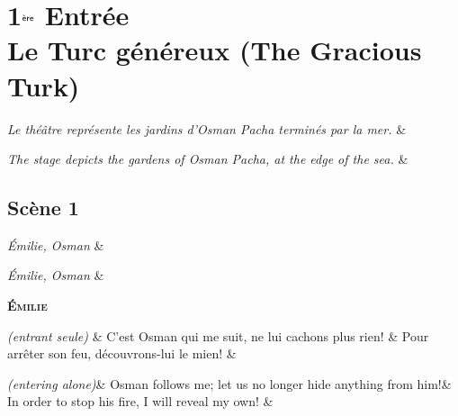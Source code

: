 \documentclass{article}
\newcommand{\accentcolr}{\color{WildStrawberry}}
\newcommand{\spotcolr}[1]{{\accentcolr#1}}
\newcommand{\secheadr}[1]{\rhead{\parbox{\marginparwidth}{\sffamily\spotcolr{#1}}}\thispagestyle{plain}}
\newcommand{\dialogue}[1]{%
    \filbreak\begin{center}
	    \textbf{\textsc{#1}}
    \end{center}\nopagebreak}
\newcommand{\stage}[1]{\hfill\emph{(#1)}\hfill}
\newcommand{\scene}[1]{\emph{#1}\hfill}
\begin{document}
\newpage

\section*{1$^{\textrm{\sffamily\`{e}re}}$ Entr\'{e}e \\ Le Turc g\'{e}n\'{e}reux (The Gracious Turk)}\secheadr{Act 1}

\begin{pairs}
\begin{Leftside}
	\stanza
		\scene{Le th\'{e}\^{a}tre repr\'{e}sente les jardins d'Osman Pacha termin\'{e}s par la mer.}
	\& 
	\endnumbering
\end{Leftside}
\begin{Rightside}
	\stanza
		\scene{The stage depicts the gardens of Osman Pacha, at the edge of the sea.}
	\&
	\endnumbering
\end{Rightside} 
\Columns 
\end{pairs}

\subsection*{Sc\`{e}ne 1}

\begin{pairs}
\begin{Leftside}
	\stanza
		\scene{\'{E}milie, Osman}
	\& 
	\endnumbering
\end{Leftside}
\begin{Rightside}
	\stanza
		\scene{\'{E}milie, Osman}
	\&
	\endnumbering
\end{Rightside} 
\Columns 
\end{pairs}

\dialogue{\'{E}milie}
\begin{pairs}
\begin{Leftside}
	\stanza
		\stage{entrant seule} &
		C'est Osman qui me suit, ne lui cachons plus rien! &
		Pour arr\^{e}ter son feu, d\'{e}couvrons-lui le mien!
    \& 
    \endnumbering
\end{Leftside}
\begin{Rightside}
	\stanza
		\stage{entering alone}&
		Osman follows me; let us no longer hide anything from him!&
		In order to stop his fire, I will reveal my own!
    \& 
    \endnumbering
\end{Rightside} 
\Columns 
\end{pairs}
\end{document}
